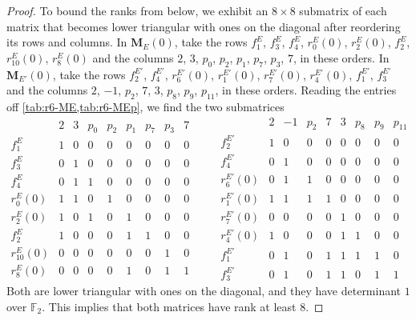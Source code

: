 \documentclass[12pt,oneside,openany]{book}
\theoremstyle{definition}
\theoremstyle{plain}
\numberwithin{equation}{chapter}
\theoremstyle{plain}
\theoremstyle{definition}
\theoremstyle{remark}
\newcommand{\F}{\mathbb F}
\begin{document}
\begin{proof}
To bound the ranks from below, we exhibit an $8\times8$ submatrix of each matrix that becomes lower triangular with ones on the diagonal after reordering its rows and columns. In $\mathbf M_E(0)$, take the rows $f^E_1$, $f^E_3$, $f^E_4$, $r^E_0(0)$, $r^E_2(0)$, $f^E_2$, $r^E_{10}(0)$, $r^E_8(0)$ and the columns $2$, $3$, $p_0$, $p_2$, $p_1$, $p_7$, $p_3$, $7$, in these orders. In $\mathbf M_{E'}(0)$, take the rows $f^{E'}_2$, $f^{E'}_4$, $r^{E'}_6(0)$, $r^{E'}_1(0)$, $r^{E'}_7(0)$, $r^{E'}_4(0)$, $f^{E'}_1$, $f^{E'}_3$ and the columns $2$, $-1$, $p_2$, $7$, $3$, $p_8$, $p_9$, $p_{11}$, in these orders. Reading the entries off \cref{tab:r6-ME,tab:r6-MEp}, we find the two submatrices
\[
\begin{array}{c|cccccccc}
 & 2 & 3 & p_0 & p_2 & p_1 & p_7 & p_3 & 7\\
\hline
f^E_1 & 1 & 0 & 0 & 0 & 0 & 0 & 0 & 0 \\
f^E_3 & 0 & 1 & 0 & 0 & 0 & 0 & 0 & 0 \\
f^E_4 & 0 & 1 & 1 & 0 & 0 & 0 & 0 & 0 \\
r^{E}_0(0) & 1 & 1 & 0 & 1 & 0 & 0 & 0 & 0 \\
r^{E}_2(0) & 1 & 0 & 1 & 0 & 1 & 0 & 0 & 0 \\
f^E_2 & 1 & 0 & 0 & 0 & 1 & 1 & 0 & 0 \\
r^{E}_{10}(0) & 0 & 0 & 0 & 0 & 0 & 0 & 1 & 0 \\
r^{E}_8(0) & 0 & 0 & 0 & 0 & 1 & 0 & 1 & 1
\end{array}
\qquad
\begin{array}{c|cccccccc}
 & 2 & -1 & p_2 & 7 & 3 & p_8 & p_9 & p_{11}\\
\hline
f^{E'}_2 & 1 & 0 & 0 & 0 & 0 & 0 & 0 & 0 \\
f^{E'}_4 & 0 & 1 & 0 & 0 & 0 & 0 & 0 & 0 \\
r^{E'}_6(0) & 0 & 1 & 1 & 0 & 0 & 0 & 0 & 0 \\
r^{E'}_1(0) & 1 & 1 & 1 & 1 & 0 & 0 & 0 & 0 \\
r^{E'}_7(0) & 0 & 0 & 0 & 0 & 1 & 0 & 0 & 0 \\
r^{E'}_4(0) & 1 & 0 & 0 & 0 & 1 & 1 & 0 & 0 \\
f^{E'}_1 & 0 & 1 & 0 & 1 & 1 & 1 & 1 & 0 \\
f^{E'}_3 & 0 & 1 & 0 & 1 & 1 & 0 & 1 & 1
\end{array}
\]
Both are lower triangular with ones on the diagonal, and they have determinant $1$ over $\F_2$. This implies that both matrices have rank at least $8$.


\end{proof}
\end{document}

